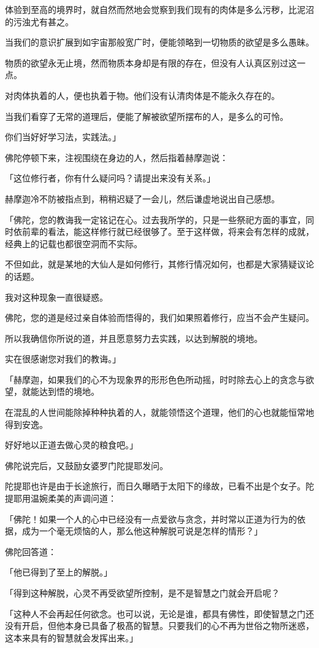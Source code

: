 \documentclass[twoside,openany]{book}
\begin{document}
体验到至高的境界时，就自然而然地会觉察到我们现有的肉体是多么污秽，比泥沼的污浊尤有甚之。

当我们的意识扩展到如宇宙那般宽广时，便能领略到一切物质的欲望是多么愚昧。

物质的欲望永无止境，然而物质本身却是有限的存在，但没有人认真区别过这一点。

对肉体执着的人，便也执着于物。他们没有认清肉体是不能永久存在的。

当我们看穿了无常的道理后，便能了解被欲望所摆布的人，是多么的可怜。

你们当好好学习法，实践法。」

佛陀停顿下来，注视围绕在身边的人，然后指着赫摩迦说：

「这位修行者，你有什么疑问吗？请提出来没有关系。」

赫摩迦冷不防被指点到，稍稍迟疑了一会儿，然后谦虚地说出自己感想。

「佛陀，您的教诲我一定铭记在心。过去我所学的，只是一些祭祀方面的事宜，同时依前辈的看法，能这样修行就已经很够了。至于这样做，将来会有怎样的成就，经典上的记载也都很空洞而不实际。

不但如此，就是某地的大仙人是如何修行，其修行情况如何，也都是大家猜疑议论的话题。

我对这种现象一直很疑惑。

佛陀，您的道是经过亲自体验而悟得的，我们如果照着修行，应当不会产生疑问。

所以我确信你所说的道，并且愿意努力去实践，以达到解脱的境地。

实在很感谢您对我们的教诲。」

「赫摩迦，如果我们的心不为现象界的形形色色所动摇，时时除去心上的贪念与欲望，就能达到悟的境地。

在混乱的人世间能除掉种种执着的人，就能领悟这个道理，他们的心也就能恒常地得到安逸。

好好地以正道去做心灵的粮食吧。」

佛陀说完后，又鼓励女婆罗门陀提耶发问。

陀提耶也许是由于长途旅行，而日久曝晒于太阳下的缘故，已看不出是个女子。陀提耶用温婉柔美的声调问道：

「佛陀！如果一个人的心中已经没有一点爱欲与贪念，并时常以正道为行为的依据，成为一个毫无烦恼的人，那么他这种解脱可说是怎样的情形？」

佛陀回答道：

「他已得到了至上的解脱。」

「得到这种解脱，心灵不再受欲望所控制，是不是智慧之门就会开启呢？

「这种人不会再起任何欲念。也可以说，无论是谁，都具有佛性，即使智慧之门还没有开启，但他本身已具备了极髙的智慧。只要我们的心不再为世俗之物所迷惑，这本来具有的智慧就会发挥出来。」
\end{document}
